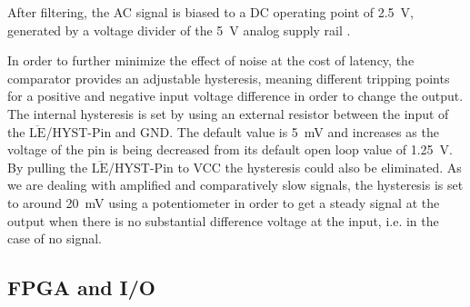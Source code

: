 \documentclass[
	english,
	ruledheaders=section, %
	class=report,%
	thesis={type=Project Seminar Report},%
	accentcolor=TUDa-1d, %
	custommargins=false,%
	marginpar=false,%
	parskip=half-,%
	fontsize=11pt,%
]{tudapub}
\newcommand{\textoverline}[1]{$\overline{\mbox{#1}}$}
\begin{document}

After filtering, the AC signal is biased to a DC operating point of \SI{2.5}{\volt}, generated by a voltage divider of the \SI{5}{\volt} analog supply rail \autocite{analogdevicesBiasingDecouplingOp}.

In order to further minimize the effect of noise at the cost of latency, the comparator provides an adjustable hysteresis, meaning different tripping points for a positive and negative input voltage difference in order to change the output. The internal hysteresis is set by using an external resistor between the input of the \textoverline{LE}/HYST-Pin and GND. The default value is \SI{5}{\milli\volt} and increases as the voltage of the pin is being decreased from its default open loop value of \SI{1.25}{\volt}. By pulling the \textoverline{LE}/HYST-Pin to VCC the hysteresis could also be eliminated. As we are dealing with amplified and comparatively slow signals, the hysteresis is set to around \SI{20}{\milli\volt} using a potentiometer in order to get a steady signal at the output when there is no substantial difference voltage at the input, i.e. in the case of no signal.

\subsection{FPGA and I/O}
\end{document}
